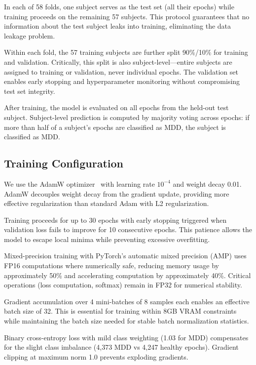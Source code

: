 \documentclass[blue,fullpaper]{ludusofficial}  %
\begin{document}
In each of 58 folds, one subject serves as the test set (all their epochs) while training proceeds on the remaining 57 subjects. This protocol guarantees that no information about the test subject leaks into training, eliminating the data leakage problem.

Within each fold, the 57 training subjects are further split 90\%/10\% for training and validation. Critically, this split is also subject-level—entire subjects are assigned to training or validation, never individual epochs. The validation set enables early stopping and hyperparameter monitoring without compromising test set integrity.

After training, the model is evaluated on all epochs from the held-out test subject. Subject-level prediction is computed by majority voting across epochs: if more than half of a subject's epochs are classified as MDD, the subject is classified as MDD.

\subsection{Training Configuration}

We use the AdamW optimizer~\cite{loshchilov2019decoupled} with learning rate $10^{-4}$ and weight decay 0.01. AdamW decouples weight decay from the gradient update, providing more effective regularization than standard Adam with L2 regularization.

Training proceeds for up to 30 epochs with early stopping triggered when validation loss fails to improve for 10 consecutive epochs. This patience allows the model to escape local minima while preventing excessive overfitting.

Mixed-precision training with PyTorch's automatic mixed precision (AMP) uses FP16 computations where numerically safe, reducing memory usage by approximately 50\% and accelerating computation by approximately 40\%. Critical operations (loss computation, softmax) remain in FP32 for numerical stability.

Gradient accumulation over 4 mini-batches of 8 samples each enables an effective batch size of 32. This is essential for training within 8GB VRAM constraints while maintaining the batch size needed for stable batch normalization statistics.

Binary cross-entropy loss with mild class weighting (1.03 for MDD) compensates for the slight class imbalance (4,373 MDD vs 4,247 healthy epochs). Gradient clipping at maximum norm 1.0 prevents exploding gradients.
\end{document}
